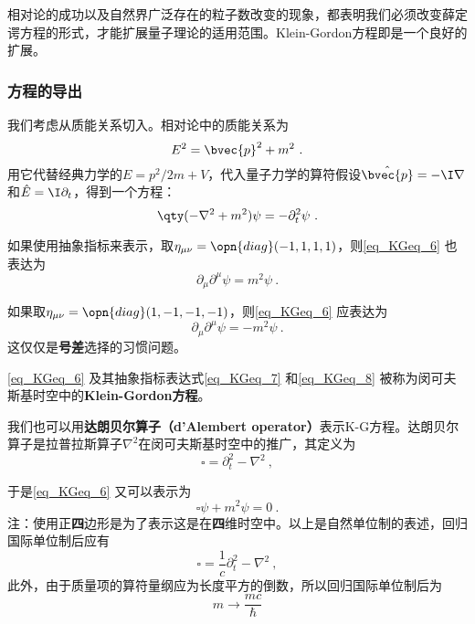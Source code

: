相对论的成功以及自然界广泛存在的粒子数改变的现象，都表明我们必须改变薛定谔方程的形式，才能扩展量子理论的适用范围。Klein-Gordon方程即是一个良好的扩展。

\subsubsection{方程的导出}

我们考虑从质能关系切入。相对论中的质能关系为
\begin{equation}
E^2=\bvec{p}^2+m^2~.
\end{equation}
用它代替经典力学的$E=p^2/2m+V$，代入量子力学的算符假设$\hat{\bvec{p}}=-\I\nabla$和$\hat{E}=\I\partial_t$，得到一个方程：
\begin{equation}\label{eq_KGeq_6}
\qty(-\nabla^2+m^2)\psi = -\partial_t^2 \psi~.
\end{equation}

如果使用抽象指标来表示，取$\eta_{\mu\nu}=\opn{diag}(-1, 1, 1, 1)$，则\autoref{eq_KGeq_6} 也表达为
\begin{equation}\label{eq_KGeq_7}
\partial_\mu\partial^\mu \psi = m^2\psi~.
\end{equation}

如果取$\eta_{\mu\nu}=\opn{diag}(1, -1, -1, -1)$，则\autoref{eq_KGeq_6} 应表达为
\begin{equation}\label{eq_KGeq_8}
\partial_\mu\partial^\mu \psi = -m^2\psi~.
\end{equation}
这仅仅是\textbf{号差}选择的习惯问题。

\autoref{eq_KGeq_6} 及其抽象指标表达式\autoref{eq_KGeq_7} 和\autoref{eq_KGeq_8} 被称为闵可夫斯基时空中的\textbf{Klein-Gordon方程}。

我们也可以用\textbf{达朗贝尔算子（d'Alembert operator）}表示K-G方程。达朗贝尔算子是拉普拉斯算子$\nabla^2$在闵可夫斯基时空中的推广，其定义为
\begin{equation}
\square = \partial_t^2-\nabla^2~,
\end{equation}


于是\autoref{eq_KGeq_6} 又可以表示为
\begin{equation}
\square \psi + m^2\psi = 0~.
\end{equation}
注：使用正\textbf{四}边形是为了表示这是在\textbf{四}维时空中。以上是自然单位制的表述，回归国际单位制后应有
\begin{equation}
\square = \frac{1}{c}\partial_t^2-\nabla^2~,
\end{equation}
此外，由于质量项的算符量纲应为长度平方的倒数，所以回归国际单位制后为
\begin{equation}
m\rightarrow \frac{mc}{\hbar}
\end{equation}


